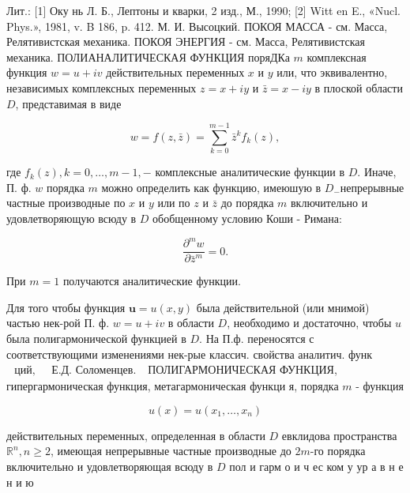 \documentclass[10pt]{article}
\begin{document}
Лит.: [1] Оку нь Л. Б., Лептоны и кварки, 2 изд., М., 1990; [2] Witt en E., «Nucl. Phys.», 1981, v. B 186, p. 412. М. И. Высоцкий. ПОКОЯ МАССА - см. Масса, Релятивистская механика. ПОКОЯ ЭНЕРГИЯ - см. Масса, Релятивистская механика. ПОЛИАНАЛИТИЧЕСКАЯ ФУНКЦИЯ поряДКа $m$ комплексная функция $w=u+i v$ действительных переменных $x$ и $y$ или, что эквивалентно, независимых комплексных переменных $z=x+i y$ и $\bar{z}=x-i y$ в плоской области $D$, представимая в виде



\[

w=f(z, \bar{z})=\sum_{k=0}^{m-1} \bar{z}^{k} f_{k}(z),

\]



где $f_{k}(z), k=0, \ldots, m-1,-$ комплексные аналитические функции в $D$. Иначе, П. ф. $w$ порядка $m$ можно определить как функцию, имеюшую в $D_{-}$непрерывные частные производные по $x$ и $y$ или по $z$ и $\bar{z}$ до порядка $m$ включительно и удовлетворяющую всюду в $D$ обобщенному условию Коши - Римана:



\[

\frac{\partial^{m} w}{\partial \bar{z}^{m}}=0 .

\]



При $m=1$ получаются аналитические функции.



Для того чтобы функция $\boldsymbol{u}=u(x, y)$ была действительной (или мнимой) частью нек-рой П. ф. $w=u+i v$ в области $D$, необходимо и достаточно, чтобы $u$ была полигармонической функцией в $D$. На П.ф. переносятся с соответствующими изменениями нек-рые классич. свойства аналитич. функ$\begin{array}{ll}\text { ций, } & \text { Е.Д. Соломенцев. }\end{array}$ ПОЛИГАРМОНИЧЕСКАЯ ФУНКЦИЯ, гипергармоническая функция, метагармоническая функци я, порядка $m$ - функция



\[

u(x)=u\left(x_{1}, \ldots, x_{n}\right)

\]



действительных переменных, определенная в области $D$ евклидова пространства $\mathbb{R}^{n}, n \geqslant 2$, имеющая непрерывные частные производные до $2 m$-го порядка включительно и удовлетворяющая всюду в $D$ пол и гарм о и ч ес ком у ур а в н е н и ю
\end{document}
